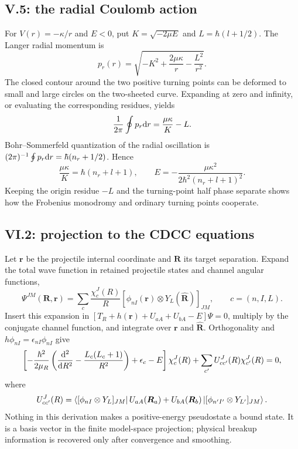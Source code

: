 \subsection*{V.5: the radial Coulomb action}

For $V(r)=-\kappa/r$ and $E<0$, put
$K=\sqrt{-2\mu E}$ and $L=\hbar(l+1/2)$.  The Langer radial momentum is
\begin{equation}
  p_r(r)=\sqrt{-K^2+\frac{2\mu\kappa}{r}-\frac{L^2}{r^2}}.
\end{equation}
The closed contour around the two positive turning points can be deformed to
small and large circles on the two-sheeted curve.  Expanding at zero and
infinity, or evaluating the corresponding residues, yields
\begin{equation}
  \frac{1}{2\pi}\oint p_r\mathrm{d} r
  =\frac{\mu\kappa}{K}-L.
\end{equation}
Bohr--Sommerfeld quantization of the radial oscillation is
$(2\pi)^{-1}\oint p_r\mathrm{d} r=\hbar(n_r+1/2)$.  Hence
\begin{equation}
  \frac{\mu\kappa}{K}=\hbar(n_r+l+1),
  \qquad
  E=-\frac{\mu\kappa^2}
  {2\hbar^2(n_r+l+1)^2}.
\end{equation}
Keeping the origin residue $-L$ and the turning-point half phase separate
shows how the Frobenius monodromy and ordinary turning points cooperate.

\subsection*{VI.2: projection to the CDCC equations}

Let $\bm r$ be the projectile internal coordinate and $\bm R$ its
target separation.  Expand the total wave function in retained projectile
states and channel angular functions,
\begin{equation}
  \Psi^{JM}(\bm R,\bm r)
  =\sum_c\frac{\chi_c^J(R)}{R}
  \left[\phi_{nI}(\bm r)\otimes Y_L(\widehat{\bm R})\right]_{JM},
  \qquad c=(n,I,L).
\end{equation}
Insert this expansion in
$[T_R+h(\bm r)+U_{aA}+U_{bA}-E]\Psi=0$, multiply by the conjugate channel
function, and integrate over $\bm r$ and $\widehat{\bm R}$.  Orthogonality and
$h\phi_{nI}=\epsilon_{nI}\phi_{nI}$ give
\begin{equation}
  \left[-\frac{\hbar^2}{2\mu_R}
  \left(\frac{\mathrm{d}^2}{\mathrm{d} R^2}
  -\frac{L_c(L_c+1)}{R^2}\right)
  +\epsilon_c-E\right]\chi_c^J(R)
  +\sum_{c'}U^J_{cc'}(R)\chi_{c'}^J(R)=0,
\end{equation}
where
\begin{equation}
  U^J_{cc'}(R)=
  \left\langle [\phi_{nI}\otimes Y_L]_{JM} \right\rvert
  U_{aA}(\bm R_a)+U_{bA}(\bm R_b)
  \left\lvert [\phi_{n'I'}\otimes Y_{L'}]_{JM} \right\rangle .
\end{equation}
Nothing in this derivation makes a positive-energy pseudostate a bound
state.  It is a basis vector in the finite model-space projection; physical
breakup information is recovered only after convergence and smoothing.

